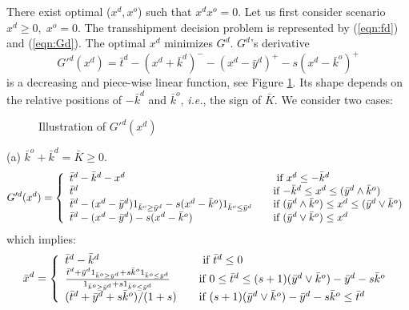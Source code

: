 \documentclass[mnsc,nonblindrev,copyedit]{informs2_wz} %
\begin{document}
There exist optimal ($x^d,x^o$) such that $x^dx^o =0$.  Let us first consider scenario $x^d \geq 0, \;x^o =0$.  The transshipment decision problem is represented by (\ref{eqn:fd}) and (\ref{eqn:Gd}).  The optimal $x^d$ minimizes $G^d$.  $G^d$'s derivative 
\begin{equation}
G'^d(x^d) = \bar{t}^d - (x^d+\bar{k}^d )^- -(x^d - \bar{y}^d)^+
-s(x^d-\bar{k}^o)^+
\end{equation}
is a decreasing and piece-wise linear function, see Figure \ref{fig:xdPrice}.  Its shape depends on the relative positions of $-\bar{k}^d$ and $\bar{k}^o$, {\it i.e.}, the sign of $\bar{K}$.  We consider two cases:
\begin{figure} [ht]
\begin{center}
\end{center}
\caption{Illustration of $G'^d(x^d)$}\label{fig:xdPrice}
\end{figure}

\noindent (a) $\bar{k}^o + \bar{k}^d = \bar{K} \geq 0$.
\begin{equation} G'^d(x^d) = \left\{
  \begin{array} {ll}
  \bar{t}^d -\bar{k}^d -x^d  \quad & \mbox{ if $x^d \leq -\bar{k}^d
  $} \\
\bar{t}^d  \quad  & \mbox{if $-\bar{k}^d \leq x^d \leq
(\bar{y}^d\wedge
\bar{k}^o) $} \\
\bar{t}^d  -(x^d - \bar{y}^d)1_{\bar{k}^o \geq \bar{y}^d}-s(x^d -
\bar{k}^o)1_{\bar{k}^o \leq \bar{y}^d} \quad  & \mbox{if $
(\bar{y}^d\wedge
\bar{k}^o) \leq x^d \leq (\bar{y}^d \vee \bar{k}^o)   $}\\
\bar{t}^d  -(x^d - \bar{y}^d)-s(x^d - \bar{k}^o) \quad  & \mbox{if
$(\bar{y}^d\vee \bar{k}^o) \leq x^d$}
  \end{array} \right.
\end{equation}
which implies:
\begin{equation}
\bar{x}^d = \left\{
  \begin{array} {ll}
  \bar{t}^d -\bar{k}^d \quad & \mbox{ if $\bar{t}^d \leq 0$} \\
\frac{\bar{t}^d  + \bar{y}^d1_{\bar{k}^o \geq
\bar{y}^d}+s\bar{k}^o1_{\bar{k}^o \leq \bar{y}^d}}{1_{\bar{k}^o
\geq \bar{y}^d}+s1_{\bar{k}^o \leq \bar{y}^d}} \quad  & \mbox{if
$0 \leq \bar{t}^d \leq (s+1)(\bar{y}^d\vee \bar{k}^o)-\bar{y}^d -
s\bar{k}^o
$}\\
(\bar{t}^d  + \bar{y}^d+s\bar{k}^o)/(1+s) \quad  & \mbox{if $
(s+1)(\bar{y}^d\vee \bar{k}^o)-\bar{y}^d - s\bar{k}^o \leq
\bar{t}^d $}
  \end{array} \right.  \label{eqn:barXd1}
\end{equation}
\end{document}
